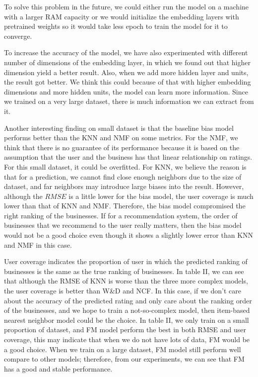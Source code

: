 \documentclass[journal]{IEEEtran}
\begin{document}
To solve this problem in the future, we could either run the model on a machine with a larger RAM capacity or we would initialize the embedding layers with pretrained weights so it would take less epoch to train the model for it to converge. 

To increase the accuracy of the model, we have also experimented with different number of dimensions of the embedding layer, in which we found out that higher dimension yield a better result. Also, when we add more hidden layer and units, the result got better. We think this could because of that with higher embedding dimensions and more hidden units, the model can learn more information. Since we trained on a very large dataset, there is much information we can extract from it.

Another interesting finding on small dataset is that the baseline bias model performs better than the KNN and NMF on some metrics. For the NMF, we think that there is no guarantee of its performance because it is based on the assumption that the user and the business has that linear relationship on ratings. For this small dataset, it could be overfitted. For KNN, we believe the reason is that for a prediction, we cannot find close enough neighbors due to the size of dataset, and far neighbors may introduce large biases into the result. However, although the $RMSE$ is a little lower for the bias model, the user coverage is much lower than that of KNN and NMF. Therefore, the bias model compromised the right ranking of the businesses. If for a recommendation system, the order of businesses that we recommend to the user really matters, then the bias model would not be a good choice even though it shows a slightly lower error than KNN and NMF in this case.

User coverage indicates the proportion of user in which the predicted ranking of businesses is the same as the true ranking of businesses. In table II, we can see that although the RMSE of KNN is worse than the three more complex models, the user coverage is better than W\&D and NCF. In this case, if we don't care about the accuracy of the predicted rating and only care about the ranking order of the businesses, and we hope to train a not-so-complex model, then item-based nearest neighbor model could be the choice. In table II, we only train on a small proportion of dataset, and FM model perform the best in both RMSE and user coverage, this may indicate that when we do not have lots of data, FM would be a good choice. When we train on a large dataset, FM model still perform well compare to other models; therefore, from our experiments, we can see that FM has a good and stable performance.
\end{document}

